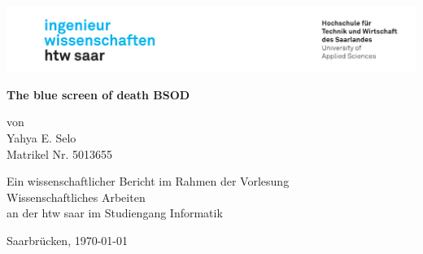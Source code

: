 \begin{titlepage}

    \linespread{1.5}

    \includegraphics[width=\linewidth]{graphics/htw_logo}


    \begin{center}
        \large
        \hfill
        \vfill
        \Large{\bfseries{The blue screen of death \glqq BSOD\grqq}}

        von \\
        Yahya E. Selo \\
        Matrikel Nr. 5013655

        \vfill

        Ein wissenschaftlicher Bericht im Rahmen der Vorlesung\\
        \glqq Wissenschaftliches Arbeiten\grqq\\
        an der htw saar im Studiengang Informatik\\

        \vfill
        \vfill

        Saarbrücken, \today
    \end{center}

\end{titlepage}
